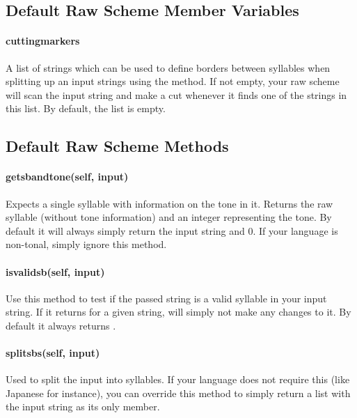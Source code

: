 \documentclass{ltxdockit}
\begin{document}
\subsection{Default Raw Scheme Member Variables}

\paragraph{cutting\textunderscore{}markers}

A list of strings which can be used to define borders between syllables when
splitting up an input strings using the  method.
If not empty, your raw scheme will scan the input string and make a cut whenever
it finds one of the strings in this list. By default, the list is empty.

\subsection{Default Raw Scheme Methods}

\paragraph{get\textunderscore{}sb\textunderscore{}and\textunderscore{}tone(self, input)}

Expects a single syllable with information on the tone in it. Returns the raw
syllable (without tone information) and an integer representing the tone. By
default it will always simply return the input string and 0. If your language is
non-tonal, simply ignore this method.

\paragraph{is\textunderscore{}valid\textunderscore{}sb(self, input)}

Use this method to test if the passed string is a valid syllable in your input
string. If it returns  for a given string,  will
simply not make any changes to it. By default it always returns .

\paragraph{split\textunderscore{}sbs(self, input)}

Used to split the input into syllables. If your language does not require this
(like Japanese for instance), you can override this method to simply return a
list with the input string as its only member.
\end{document}

